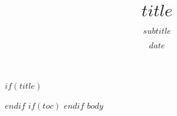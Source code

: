 \documentclass[man$if(floatsintext)$,floatsintext$endif$$if(draft)$,draftall$endif$]{apa7}
\title{$title$}
\subtitle{$subtitle$}
\date{$date$}
\begin{document}
$if(title)$
\maketitle
$endif$
$if(toc)$
\tableofcontents
$endif$
$body$
\end{document}
